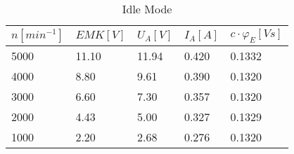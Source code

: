 \begin{table}[htbp]
    \centering
    \begin{tabularx}{\columnwidth}{XXXXX}
        \toprule
        $n[min^{-1}]$ & $EMK[V]$ & $U_A[V]$ & $I_A[A]$ & $c\cdot\varphi_E[Vs]$ \\
        \midrule
        5000          & 11.10    & 11.94    & 0.420    & 0.1332                \\
        4000          & 8.80     & 9.61     & 0.390    & 0.1320                \\
        3000          & 6.60     & 7.30     & 0.357    & 0.1320                \\
        2000          & 4.43     & 5.00     & 0.327    & 0.1329                \\
        1000          & 2.20     & 2.68     & 0.276    & 0.1320                \\
        \bottomrule
    \end{tabularx}
    \caption{Idle Mode}
    \label{tab:idle_mode}
\end{table}

